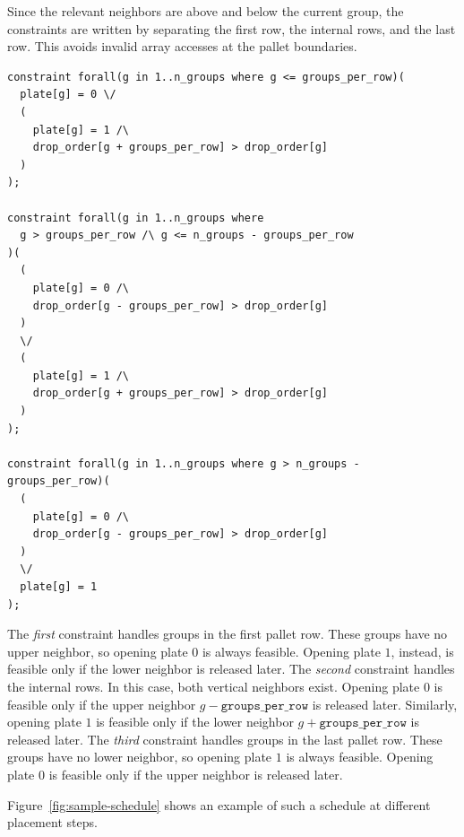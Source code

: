 Since the relevant neighbors are above and below the current group, the
constraints are written by separating the first row, the internal rows, and the
last row. This avoids invalid array accesses at the pallet boundaries.

\vspace{0.5cm}
\begin{lstlisting}
constraint forall(g in 1..n_groups where g <= groups_per_row)(
  plate[g] = 0 \/
  (
    plate[g] = 1 /\
    drop_order[g + groups_per_row] > drop_order[g]
  )
);

constraint forall(g in 1..n_groups where
  g > groups_per_row /\ g <= n_groups - groups_per_row
)(
  (
    plate[g] = 0 /\
    drop_order[g - groups_per_row] > drop_order[g]
  )
  \/
  (
    plate[g] = 1 /\
    drop_order[g + groups_per_row] > drop_order[g]
  )
);

constraint forall(g in 1..n_groups where g > n_groups - groups_per_row)(
  (
    plate[g] = 0 /\
    drop_order[g - groups_per_row] > drop_order[g]
  )
  \/
  plate[g] = 1
);
\end{lstlisting}
\vspace{0.5cm}

The \textit{first} constraint handles groups in the first pallet row. These groups have
no upper neighbor, so opening plate \(0\) is always feasible. Opening plate
\(1\), instead, is feasible only if the lower neighbor is released later.
The \textit{second} constraint handles the internal rows. In this case, both vertical
neighbors exist. Opening plate \(0\) is feasible only if the upper neighbor
\(g-\texttt{groups\_per\_row}\) is released later. Similarly, opening plate
\(1\) is feasible only if the lower neighbor
\(g+\texttt{groups\_per\_row}\) is released later.
The \textit{third} constraint handles groups in the last pallet row. These groups have
no lower neighbor, so opening plate \(1\) is always feasible. Opening plate
\(0\) is feasible only if the upper neighbor is released later.

Figure~\ref{fig:sample-schedule} shows an example of such a
schedule at different placement steps.


